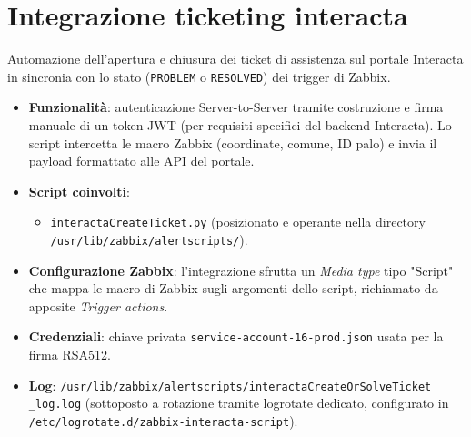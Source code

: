 \documentclass[12pt, a4paper]{report}
\begin{document}
\section{Integrazione ticketing interacta}
Automazione dell'apertura e chiusura dei ticket di assistenza sul portale Interacta 
in sincronia con lo stato (\texttt{PROBLEM} o \texttt{RESOLVED}) dei trigger di Zabbix.
\begin{itemize}
    \item \textbf{Funzionalità}: autenticazione Server-to-Server tramite costruzione e firma manuale di un token JWT 
    (per requisiti specifici del backend Interacta). Lo script intercetta le macro Zabbix 
    (coordinate, comune, ID palo) e invia il payload formattato alle API del portale.
    \item \textbf{Script coinvolti}:
    \begin{itemize}
        \item \texttt{interactaCreateTicket.py} (posizionato e operante nella directory \\\texttt{/usr/lib/zabbix/alertscripts/}).
    \end{itemize}
    \item \textbf{Configurazione Zabbix}: l'integrazione sfrutta un \textit{Media type} tipo "Script" 
    che mappa le macro di Zabbix sugli argomenti dello script, richiamato da apposite \textit{Trigger actions}.
    \item \textbf{Credenziali}: chiave privata \texttt{service-account-16-prod.json} usata per la firma RSA512.
    \item \textbf{Log}: \texttt{/usr/lib/zabbix/alertscripts/interactaCreateOrSolveTicket}\\\texttt{\_log.log} 
    (sottoposto a rotazione tramite logrotate dedicato, configurato in \\\texttt{/etc/logrotate.d/zabbix-interacta-script}).
\end{itemize}
\end{document}
